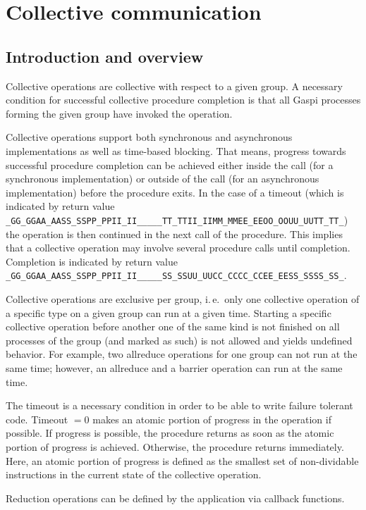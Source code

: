 \documentclass[a4paper]{article}
\makeatletter
\newlength{\st}\setlength{\st}{0pt}
\newcommand{\zerowsep}{\hskip 0pt plus 0.1pt minus 0.1pt}
\newcommand{\ZSEP}[1]{\ifx#1\@@@EOZ@@@\let\next\relax\else\ifx#1\_#1\zerowsep\else#1\fi\let\next\ZSEP\fi\next}
\newcommand{\zsep}[1]{\ZSEP{}#1\@@@EOZ@@@}
\newcommand{\GASPI}{{\sc Gaspi}}
\newcommand{\GASPISUCC}{{\tt\protect\zsep{GASPI\_SUCCESS}}}
\newcommand{\GASPITIME}{{\tt\protect\zsep{GASPI\_TIMEOUT}}}
\makeatother
\begin{document}
\section{Collective communication}
\label{sec:collectives}

\subsection{Introduction and overview}

Collective operations are collective with respect to a given group.
A necessary condition for successful collective procedure completion is that all
\GASPI{} processes forming the given group have invoked the operation.

Collective operations support both synchronous and asynchronous implementations as
well as time-based blocking. That means, progress towards successful procedure
completion can be achieved either inside the call (for a synchronous implementation)
or outside of the call (for an asynchronous implementation) before the procedure exits.
In the case of a timeout (which is indicated
by return value \GASPITIME{}) the operation is then continued in the
next call of the procedure. This implies that a collective operation
may involve several procedure calls until completion. Completion is
indicated by return value \GASPISUCC{}.

Collective operations are exclusive per group, i.\,e.\ only one collective
operation of a specific type on a given group can run at a given time. Starting a
specific collective operation before another one of the same kind is not
finished on all processes of the group
(and marked as such) is not allowed and yields undefined behavior.
For example, two allreduce operations for one group can not run at the same time; however,
an allreduce and a barrier operation can run at the same time.

The timeout is a necessary condition in order to be able to write
failure tolerant code. Timeout $=0$ makes an atomic portion of
progress in the operation if possible. If progress is possible, the
procedure returns as soon as the atomic portion of progress is
achieved. Otherwise, the procedure returns immediately. Here, an
atomic portion of progress is defined as the smallest set of
non-dividable instructions in the current state of the collective
operation.

Reduction operations can be defined by the application via callback
functions.
\end{document}
